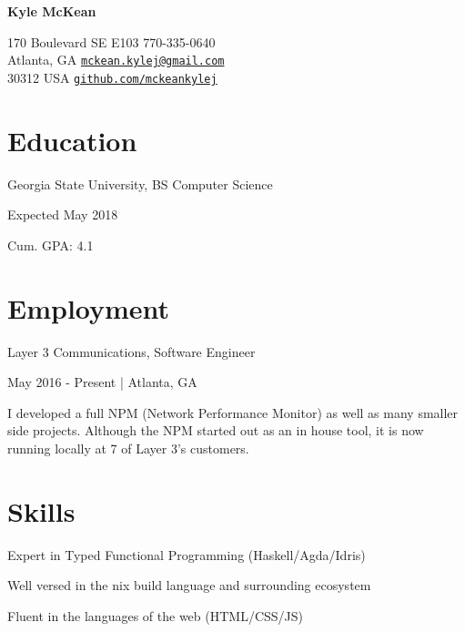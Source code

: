 \documentclass[letterpaper]{article}
\def\name{Kyle McKean}
\renewenvironment{itemize}{
  \begin{list}{}{
    \setlength{\leftmargin}{1.5em}
  }
}{
  \end{list}
}
\begin{document}
\centerline{\huge \bf \name}

\vspace{0.25in}

170 Boulevard SE E103 \hfill 770-335-0640 \\
Atlanta, GA           \hfill \href{mailto:mckean.kylej@gmail.com}{\tt mckean.kylej@gmail.com} \\
30312 USA             \hfill \href{https://github.com/mckeankylej}{\tt github.com/mckeankylej}

\section*{Education}

\begin{itemize}
  \item Georgia State University, BS Computer Science
  \begin{itemize}
      \item \textbullet{} Expected May 2018
      \item \textbullet{} Cum. GPA: 4.1
  \end{itemize}

\end{itemize}


\section*{Employment}

\begin{itemize}
    \item Layer 3 Communications, Software Engineer 
    \begin{itemize}
        \item \textbullet{} May 2016 - Present | Atlanta, GA
        \item \textbullet{} I developed a full NPM (Network Performance Monitor) as well as many smaller side projects. Although the NPM started out as an in house tool, it is now running locally at 7 of Layer 3's customers.
    \end{itemize}
\end{itemize}

\section*{Skills}

\begin{itemize}
    \item Expert in Typed Functional Programming (Haskell/Agda/Idris)
    \item Well versed in the nix build language and surrounding ecosystem
    \item Fluent in the languages of the web (HTML/CSS/JS)
\end{itemize}
\end{document}
